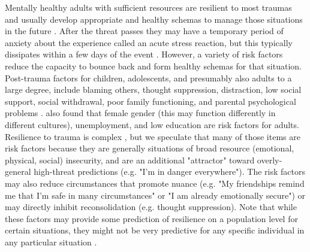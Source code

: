 \documentclass[12pt,letterpaper]{book}
\begin{document}
Mentally healthy adults with sufficient resources are resilient to most traumas and usually develop appropriate and healthy schemas to manage those situations in the future \cite{bonanno2008loss}. After the threat passes they may have a temporary period of anxiety about the experience called an acute stress reaction, but this typically dissipates within a few days of the event \cite{harrison2021icd}. However, a variety of risk factors reduce the capacity to bounce back and form healthy schemas for that situation. Post-trauma factors for children, adolescents, and presumably also adults to a large degree, include blaming others, thought suppression, distraction, low social support, social withdrawal, poor family functioning, and parental psychological problems \cite{trickeyRiskFactors}. \cite{tangRiskFactors} also found that female gender (this may function differently in different cultures), unemployment, and low education are risk factors for adults. Resilience to trauma is complex \cite{bonanno2008loss}, but we speculate that many of those items are risk factors because they are generally situations of broad resource (emotional, physical, social) insecurity, and are an additional "attractor" toward overly-general high-threat predictions (e.g. "I'm in danger everywhere"). The risk factors may also reduce circumstances that promote nuance (e.g. "My friendships remind me that I'm safe in many circumstances" or "I am already emotionally secure") or may directly inhibit reconsolidation (e.g. thought suppression). Note that while these factors may provide some prediction of resilience on a population level for certain situations, they might not be very predictive for any specific individual in any particular situation \cite{bonannoRelilienceParadox}.
\end{document}
